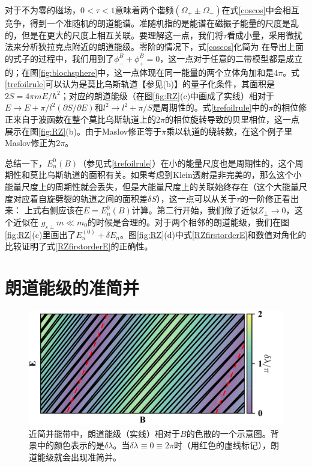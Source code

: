 对于不为零的磁场，$0{<}\tau{<}1$意味着两个谐频$(\Omega_+{\pm}\Omega_-)$在式\ref{coscos}中会相互竞争，得到一个准随机的朗道能谱\cite{kaganov_coherent_1983}。准随机指的是能谱在磁振子能量的尺度是乱的，但是在更大的尺度上相互关联。要理解这一点，我们将$\tau$看成小量，采用微扰法来分析狄拉克点附近的朗道能级。零阶的情况下，式\ref{coscos}化简为
在导出上面的式子的过程中，我们用到了$\phi^B_-{+}\phi^B_+{=}0$，这一点对于任意的二带模型都是成立的；在图\ref{fig:blochsphere}中，这一点体现在同一能量的两个立体角加和是$4\pi$。式\ref{trefoilrule}可以认为是莫比乌斯轨道【参见(b)】的量子化条件，其面积是$2S{=}4\pi m E{/\hbar^2}$；对应的朗道能级（在图\ref{fig:RZ}(c)中画成了实线）相对于$E{\rightarrow}E{+}\pi/l^2(\partial S/\partial E)$和$l^2{\rightarrow}l^2{+}\pi/S$是周期性的。式\ref{trefoilrule}中的$\pi$的相位修正来自于波函数在整个莫比乌斯轨道上的$2\pi$的相位旋转导致的贝里相位，这一点展示在图\ref{fig:RZ}(b)。由于Maslov修正等于$\pi$乘以轨道的绕转数，在这个例子里Maslov修正为$2\pi$。

总结一下，$E_n^0(B)$（参见式\ref{trefoilrule}）在小的能量尺度也是周期性的，这个周期性和莫比乌斯轨道的面积有关。如果考虑到Klein透射是非完美的，那么这个小能量尺度上的周期性就会丢失，但是大能量尺度上的关联始终存在（这个大能量尺度对应着自旋劈裂的轨道之间的面积差$\delta S$），这一点可以从关于$\tau$的一阶修正看出来：
上式右侧应该在$E{=}E_n^0(B)$计算。第二行开始，我们做了近似$Z_{\perp}{\rightarrow}0$，这个近似在 $g_{s\perp}m{\ll}m_0$的时候是合理的。对于两个相邻的朗道能级，我们在图\ref{fig:RZ}(c)里画出了$E_n^{(0)}+\delta E_n$。图\ref{fig:RZ}(d)中式\ref{RZfirstorderE}和数值对角化的比较证明了式\ref{RZfirstorderE}的正确性。

\section{朗道能级的准简并}\label{sec:llquasideg}

\begin{figure}
	\includegraphics[width=1.0\textwidth]{../figures/LL.png}
	\centering
	\caption{近简并能带中，朗道能级（实线）相对于$B$的色散的一个示意图。背景中的颜色表示的是$\delta\lambda$。当$\delta\lambda\equiv 0\equiv 2\pi$时（用红色的虚线标记），朗道能级就会出现准简并。\label{fig:LL}}
\end{figure}

